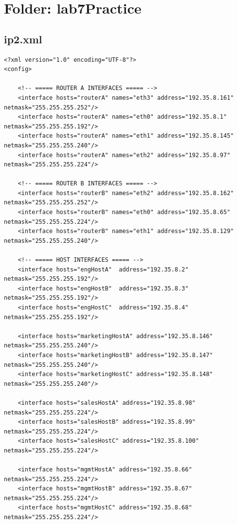 \documentclass[11pt,a4paper]{article}
\begin{document}
\section{Folder: lab7Practice}

\subsection*{ip2.xml}
\begin{lstlisting}[style=labcode]
<?xml version="1.0" encoding="UTF-8"?>
<config>

    <!-- ===== ROUTER A INTERFACES ===== -->
    <interface hosts="routerA" names="eth3" address="192.35.8.161" netmask="255.255.255.252"/>
    <interface hosts="routerA" names="eth0" address="192.35.8.1"   netmask="255.255.255.192"/>
    <interface hosts="routerA" names="eth1" address="192.35.8.145" netmask="255.255.255.240"/>
    <interface hosts="routerA" names="eth2" address="192.35.8.97"  netmask="255.255.255.224"/>

    <!-- ===== ROUTER B INTERFACES ===== -->
    <interface hosts="routerB" names="eth2" address="192.35.8.162" netmask="255.255.255.252"/>
    <interface hosts="routerB" names="eth0" address="192.35.8.65"  netmask="255.255.255.224"/>
    <interface hosts="routerB" names="eth1" address="192.35.8.129" netmask="255.255.255.240"/>

    <!-- ===== HOST INTERFACES ===== -->
    <interface hosts="engHostA"  address="192.35.8.2" netmask="255.255.255.192"/>
    <interface hosts="engHostB"  address="192.35.8.3" netmask="255.255.255.192"/>
    <interface hosts="engHostC"  address="192.35.8.4" netmask="255.255.255.192"/>

    <interface hosts="marketingHostA" address="192.35.8.146" netmask="255.255.255.240"/>
    <interface hosts="marketingHostB" address="192.35.8.147" netmask="255.255.255.240"/>
    <interface hosts="marketingHostC" address="192.35.8.148" netmask="255.255.255.240"/>

    <interface hosts="salesHostA" address="192.35.8.98"  netmask="255.255.255.224"/>
    <interface hosts="salesHostB" address="192.35.8.99"  netmask="255.255.255.224"/>
    <interface hosts="salesHostC" address="192.35.8.100" netmask="255.255.255.224"/>

    <interface hosts="mgmtHostA" address="192.35.8.66" netmask="255.255.255.224"/>
    <interface hosts="mgmtHostB" address="192.35.8.67" netmask="255.255.255.224"/>
    <interface hosts="mgmtHostC" address="192.35.8.68" netmask="255.255.255.224"/>


\end{lstlisting}
\end{document}
